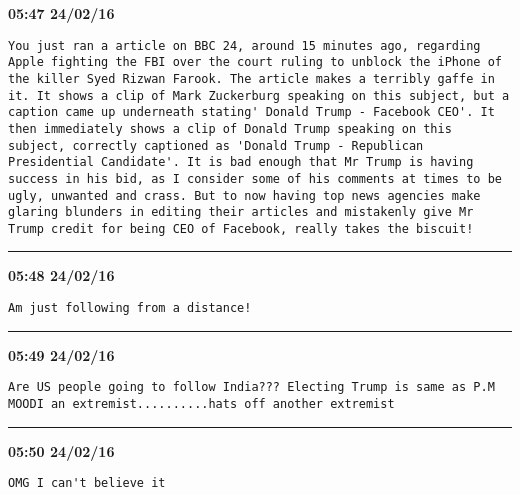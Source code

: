 \begin{adjustwidth}{0cm}{0cm}
\footnotesize \textbf{05:47 24/02/16}

\begin{lstlisting}[breaklines, breakatwhitespace, basicstyle=\small, frame=leftline]
You just ran a article on BBC 24, around 15 minutes ago, regarding Apple fighting the FBI over the court ruling to unblock the iPhone of the killer Syed Rizwan Farook. The article makes a terribly gaffe in it. It shows a clip of Mark Zuckerburg speaking on this subject, but a caption came up underneath stating' Donald Trump - Facebook CEO'. It then immediately shows a clip of Donald Trump speaking on this subject, correctly captioned as 'Donald Trump - Republican Presidential Candidate'. It is bad enough that Mr Trump is having success in his bid, as I consider some of his comments at times to be ugly, unwanted and crass. But to now having top news agencies make glaring blunders in editing their articles and mistakenly give Mr Trump credit for being CEO of Facebook, really takes the biscuit!
\end{lstlisting}
\end{adjustwidth}

\hrule%

\begin{adjustwidth}{0cm}{0cm}
\footnotesize \textbf{05:48 24/02/16}

\begin{lstlisting}[breaklines, breakatwhitespace, basicstyle=\small, frame=leftline]
Am just following from a distance!
\end{lstlisting}
\end{adjustwidth}

\hrule%

\begin{adjustwidth}{0cm}{0cm}
\footnotesize \textbf{05:49 24/02/16}

\begin{lstlisting}[breaklines, breakatwhitespace, basicstyle=\small, frame=leftline]
Are US people going to follow India??? Electing Trump is same as P.M MOODI an extremist..........hats off another extremist
\end{lstlisting}
\end{adjustwidth}

\hrule%

\begin{adjustwidth}{0cm}{0cm}
\footnotesize \textbf{05:50 24/02/16}

\begin{lstlisting}[breaklines, breakatwhitespace, basicstyle=\small, frame=leftline]
OMG I can't believe it
\end{lstlisting}
\end{adjustwidth}

